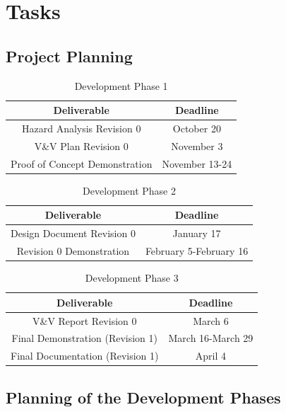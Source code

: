 \documentclass[12pt]{article}
\begin{document}
\section{Tasks}
\subsection{Project Planning}
\begin{table}[H]
  \centering
  \begin{tabular}{ |c|c| } 
  \hline
  \textbf{Deliverable} & \textbf{Deadline} \\ 
  \hline
  Hazard Analysis Revision 0 & October 20 \\
  \hline
  V\&V Plan Revision 0 & November 3 \\ 
  \hline
  Proof of Concept Demonstration & November 13-24 \\ 
  \hline
  \end{tabular}
  \caption{Development Phase 1}
  \label{tab:developmentphase1}
\end{table}

\begin{table}[H]
  \centering
  \begin{tabular}{ |c|c| } 
  \hline
  \textbf{Deliverable} & \textbf{Deadline} \\ 
  \hline
  Design Document Revision 0 & January 17 \\
  \hline
  Revision 0 Demonstration & February 5-February 16 \\ 
  \hline
  \end{tabular}
  \caption{Development Phase 2}
  \label{tab:developmentphase2}
\end{table}

\begin{table}[H]
  \centering
  \begin{tabular}{ |c|c| } 
  \hline
  \textbf{Deliverable} & \textbf{Deadline} \\ 
  \hline
  V\&V Report Revision 0 & March 6 \\ 
  \hline
  Final Demonstration (Revision 1) & March 16-March 29 \\
  \hline
  Final Documentation (Revision 1) & April 4 \\ 
  \hline
  \end{tabular}
  \caption{Development Phase 3}
  \label{tab:developmentphase3}
\end{table}
\subsection{Planning of the Development Phases}
\end{document}
